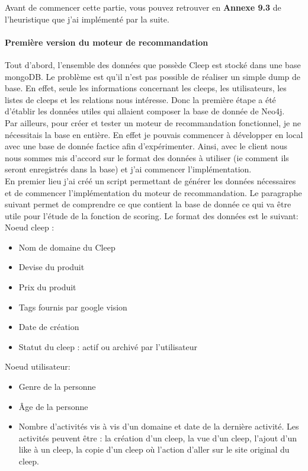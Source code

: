 \documentclass{article} %
\begin{document}
Avant de commencer cette partie, vous pouvez retrouver en \textbf{Annexe 9.3} de l'heuristique que j'ai implémenté par la suite. 

\paragraph{Première version du moteur de recommandation\\}
Tout d'abord, l'ensemble des données que possède Cleep est stocké dans une base mongoDB. Le problème est qu'il n'est pas possible de réaliser un simple dump de base. En effet, seule les informations concernant les cleeps, les utilisateurs, les listes de cleeps et les relations nous intéresse. Donc la première étape a été d'établir les données utiles qui allaient composer la base de donnée de Neo4j.\\
Par ailleurs, pour créer et tester un moteur de recommandation fonctionnel, je ne nécessitais la base en entière. En effet je pouvais commencer à développer en local avec une base de donnée factice afin d'expérimenter. Ainsi, avec le client nous nous sommes mis d'accord sur le format des données à utiliser (ie comment ils seront enregistrés dans la base) et j'ai commencer l'implémentation.\\
En premier lieu j'ai créé un script permettant de générer les données nécessaires et de commencer l'implémentation du moteur de recommandation. Le paragraphe suivant permet de comprendre ce que contient la base de donnée ce qui va être utile pour l'étude de la fonction de scoring. Le format des données est le suivant:\\
Noeud cleep :
\begin{itemize}
	\item Nom de domaine du Cleep
	\item Devise du produit
	\item Prix du produit
	\item Tags fournis par google vision
	\item Date de création
	\item Statut du cleep : actif ou archivé par l'utilisateur
\end{itemize}

Noeud utilisateur:
\begin{itemize}
	\item Genre de la personne
	\item Âge de la personne
	\item Nombre d'activités vis à vis d'un domaine et date de la dernière activité. Les activités peuvent être : la création d'un cleep, la vue d'un cleep, l'ajout d'un like à un cleep, la copie d'un cleep où l'action d'aller sur le site original du cleep. 
\end{itemize}
\end{document}
